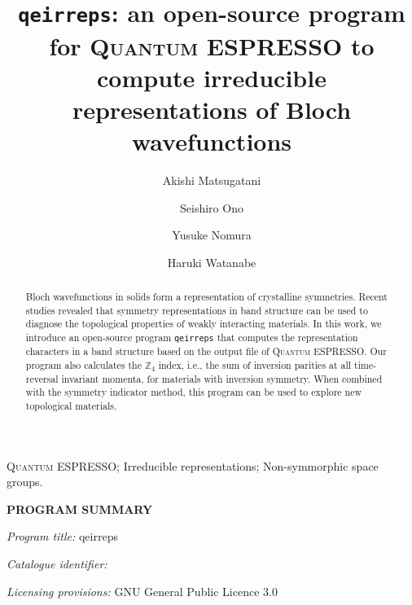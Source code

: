 \documentclass[3p,preprint]{elsarticle}
\newcommand{\mZ}{\mathbb{Z}}
\newcommand{\akishi}[1]{ { \color{magenta} \footnotesize (\textsf{AM}) \textsf{\textsl{#1}} } }
\begin{document}
\begin{frontmatter}



%
\author[UTokyo]{Akishi Matsugatani}
\author[UTokyo]{Seishiro Ono}
\author[RIKEN]{Yusuke Nomura}
\author[UTokyo]{Haruki Watanabe}
\address[UTokyo]{Department of Applied Physics, University of Tokyo, Tokyo 113-8656, Japan}
\address[RIKEN]{RIKEN Center for Emergent Matter Science, 2-1 Hirosawa, Wako, Saitama 351-0198, Japan}

\date{}
\title{\texttt{qeirreps}: an open-source program for \textsc{Quantum ESPRESSO} to compute irreducible representations of Bloch wavefunctions}

\begin{abstract}
Bloch wavefunctions in solids form a representation of crystalline symmetries. Recent studies revealed that symmetry representations in band structure can be used to diagnose the topological properties of weakly interacting materials. In this work, we introduce an open-source program \texttt{qeirreps} that computes the representation characters in a band structure based on the output file of \textsc{Quantum ESPRESSO}. Our program also calculates the  $\mZ_4$ index, i.e., the sum of inversion parities at all time-reversal invariant momenta, for materials with inversion symmetry. When combined with the symmetry indicator method, this program can be used to explore new topological materials.
\end{abstract}


\begin{keyword}
\textsc{Quantum ESPRESSO};
Irreducible representations;
Non-symmorphic space groups.
\end{keyword}

\end{frontmatter}


\noindent\textbf{PROGRAM SUMMARY}

\noindent\textit{Program title:} qeirreps

\noindent\textit{Catalogue identifier:} 



\noindent\textit{Licensing provisions:} GNU General Public Licence 3.0
\end{document}
